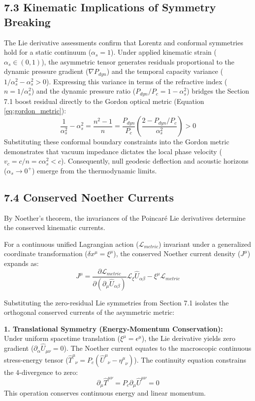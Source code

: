 \subsection*{7.3 Kinematic Implications of Symmetry Breaking}
The Lie derivative assessments confirm that Lorentz and conformal symmetries hold for a static continuum ($\alpha_s = 1$). Under applied kinematic strain ($\alpha_s \in (0, 1)$), the asymmetric tensor generates residuals proportional to the dynamic pressure gradient ($\nabla P_{dyn}$) and the temporal capacity variance ($1/\alpha_s^2 - \alpha_s^2 > 0$). Expressing this variance in terms of the refractive index ($n = 1/\alpha_s^2$) and the dynamic pressure ratio ($P_{dyn}/P_c = 1 - \alpha_s^2$) bridges the Section 7.1 boost residual directly to the Gordon optical metric (Equation \ref{eq:gordon_metric}):
\begin{equation}
    \frac{1}{\alpha_s^2} - \alpha_s^2 = \frac{n^2 - 1}{n} = \frac{P_{dyn}}{P_c}\left(\frac{2 - P_{dyn}/P_c}{\alpha_s^2}\right) > 0 %
\end{equation}
Substituting these conformal boundary constraints into the Gordon metric demonstrates that vacuum impedance dictates the local phase velocity ($v_c = c/n = c\alpha_s^2 < c$). Consequently, null geodesic deflection and acoustic horizons ($\alpha_s \to 0^+$) emerge from the thermodynamic limits.

\subsection*{7.4 Conserved Noether Currents}
By Noether's theorem, the invariances of the Poincar\'e Lie derivatives determine the conserved kinematic currents. 

For a continuous unified Lagrangian action ($\mathcal{L}_{metric}$) invariant under a generalized coordinate transformation ($\delta x^\mu = \xi^\mu$), the conserved Noether current density ($J^\mu$) expands as:
\begin{equation}
    J^\mu = \frac{\partial \mathcal{L}_{metric}}{\partial (\partial_\mu \hat{U}_{\alpha\beta})} \mathcal{L}_\xi \hat{U}_{\alpha\beta} - \xi^\mu \mathcal{L}_{metric} 
\end{equation}

Substituting the zero-residual Lie symmetries from Section 7.1 isolates the orthogonal conserved currents of the asymmetric metric:

\textbf{1. Translational Symmetry (Energy-Momentum Conservation):} \\
Under uniform spacetime translation ($\xi^\mu = \epsilon^\mu$), the Lie derivative yields zero gradient ($\partial_\alpha \hat{U}_{\mu\nu} = 0$). The Noether current equates to the macroscopic continuous stress-energy tensor ($\hat{T}^{\mu}_{\phantom{\mu}\nu} = P_c(\hat{U}^{\mu}_{\phantom{\mu}\nu} - \eta^{\mu}_{\phantom{\mu}\nu})$). The continuity equation constrains the 4-divergence to zero:
\begin{equation}
    \partial_\mu \hat{T}^{\mu\nu} = P_c \partial_\mu \hat{U}^{\mu\nu} = 0
\end{equation}
This operation conserves continuous energy and linear momentum.

